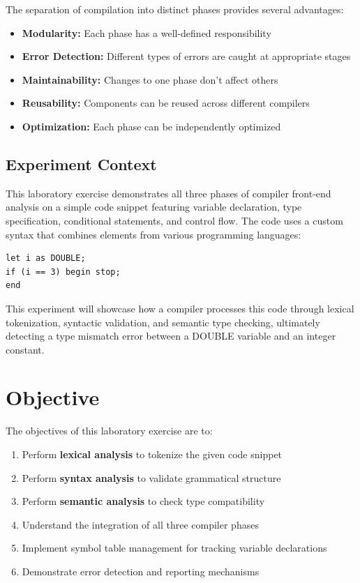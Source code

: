 \documentclass[12pt,a4paper]{article}
\begin{document}
The separation of compilation into distinct phases provides several advantages:
\begin{itemize}
    \item \textbf{Modularity:} Each phase has a well-defined responsibility
    \item \textbf{Error Detection:} Different types of errors are caught at appropriate stages
    \item \textbf{Maintainability:} Changes to one phase don't affect others
    \item \textbf{Reusability:} Components can be reused across different compilers
    \item \textbf{Optimization:} Each phase can be independently optimized
\end{itemize}

\subsection{Experiment Context}

This laboratory exercise demonstrates all three phases of compiler front-end analysis on a simple code snippet featuring variable declaration, type specification, conditional statements, and control flow. The code uses a custom syntax that combines elements from various programming languages:

\begin{verbatim}
let i as DOUBLE;
if (i == 3) begin stop;
end
\end{verbatim}

This experiment will showcase how a compiler processes this code through lexical tokenization, syntactic validation, and semantic type checking, ultimately detecting a type mismatch error between a DOUBLE variable and an integer constant.

\section{Objective}

The objectives of this laboratory exercise are to:
\begin{enumerate}
    \item Perform \textbf{lexical analysis} to tokenize the given code snippet
    \item Perform \textbf{syntax analysis} to validate grammatical structure
    \item Perform \textbf{semantic analysis} to check type compatibility
    \item Understand the integration of all three compiler phases
    \item Implement symbol table management for tracking variable declarations
    \item Demonstrate error detection and reporting mechanisms
\end{enumerate}
\end{document}
